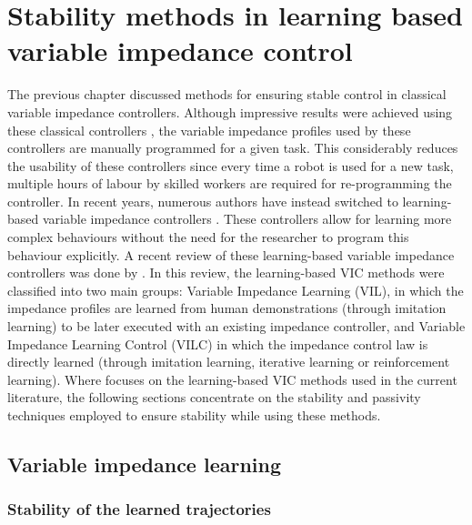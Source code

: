 \chapter{Stability methods in learning based variable impedance control}
\label{chapter:learning_based_variable_impedance}

The previous chapter discussed methods for ensuring stable control in classical variable impedance controllers. Although impressive results were achieved using these classical controllers \cite{songTutorialSurveyComparison2019}, the variable impedance profiles used by these controllers are manually programmed for a given task. This considerably reduces the usability of these controllers since every time a robot is used for a new task, multiple hours of labour by skilled workers are required for re-programming the controller. In recent years, numerous authors have instead switched to learning-based variable impedance controllers \cite{abu-dakkaVariableImpedanceControl2020}. These controllers allow for learning more complex behaviours without the need for the researcher to program this behaviour explicitly. A recent review of these learning-based variable impedance controllers was done by \cite{abu-dakkaVariableImpedanceControl2020}. In this review, the learning-based VIC methods were classified into two main groups: Variable Impedance Learning (VIL), in which the impedance profiles are learned from human demonstrations (through imitation learning) to be later executed with an existing impedance controller, and Variable Impedance Learning Control (VILC) in which the impedance control law is directly learned (through imitation learning, iterative learning or reinforcement learning). Where \cite{abu-dakkaVariableImpedanceControl2020} focuses on the learning-based VIC methods used in the current literature, the following sections concentrate on the stability and passivity techniques employed to ensure stability while using these methods.

\section{Variable impedance learning}

\subsection{Stability of the learned trajectories}

